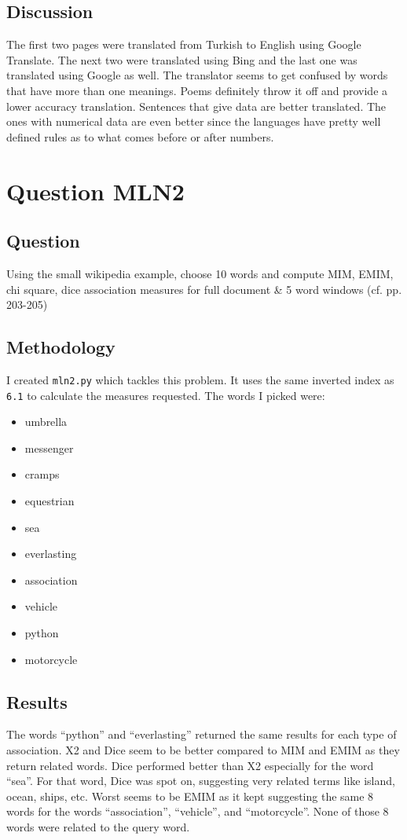 \documentclass[10pt,letterpaper,bibliography=totoc]{scrartcl}
\begin{document}
\subsection{Discussion}
The first two pages were translated from Turkish to English using Google Translate. The next two were translated using Bing and the last one was translated using Google as well. The translator seems to get confused by words that have more than one meanings. Poems definitely throw it off and provide a lower accuracy translation. Sentences that give data are better translated. The ones with numerical data are even better since the languages have pretty well defined rules as to what comes before or after numbers. 

\section{Question MLN2}
\subsection{Question}
Using the small wikipedia example, choose 10 words and compute MIM, EMIM, chi square, dice association measures for full document \& 5 word windows (cf. pp. 203-205)

\subsection{Methodology}
I created \texttt{mln2.py} which tackles this problem. It uses the same inverted index as \texttt{6.1} to calculate the measures requested. 
The words I picked were:\\
\begin{itemize}
    \item umbrella
    \item messenger
    \item cramps
    \item equestrian
    \item sea
    \item everlasting
    \item association
    \item vehicle
    \item python
    \item motorcycle
\end{itemize}

\subsection{Results}
The words ``python'' and ``everlasting'' returned the same results for each type of association. X2 and Dice seem to be better compared to MIM and EMIM as they return related words. Dice performed better than X2 especially for the word ``sea''. For that word, Dice was spot on, suggesting very related terms like island, ocean, ships, etc. Worst seems to be EMIM as it kept suggesting the same 8 words for the words ``association'', ``vehicle'', and ``motorcycle''. None of those 8 words were related to the query word. 
\end{document}
